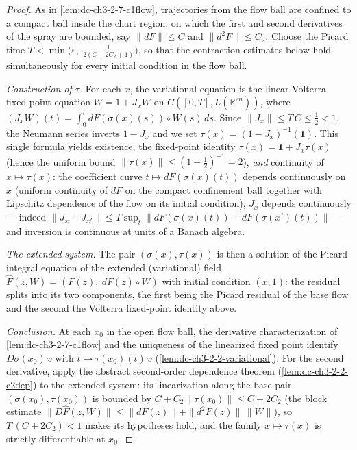 \begin{proof}
  \sketch

  As in \cref{lem:dc-ch3-2-7-c1flow}, trajectories from the flow ball are
  confined to a compact ball inside the chart region, on which the first and
  second derivatives of the spray are bounded, say $\|dF\| \le C$ and
  $\|d^2F\| \le C_2$. Choose the Picard time
  $T < \min\big(\varepsilon,\ \tfrac{1}{2(C + 2C_2 + 1)}\big)$, so that the
  contraction estimates below hold simultaneously for every initial condition
  in the flow ball.

  \emph{Construction of $\tau$.} For each $x$, the variational equation is
  the linear Volterra fixed-point equation $W = 1 + J_x W$ on $C([0,T],
  L(\mathbb{R}^{2n}))$, where $(J_x W)(t) = \int_0^t dF(\sigma(x)(s)) \circ
  W(s)\, ds$. Since $\|J_x\| \le T\,C \le \tfrac12 < 1$, the Neumann series
  inverts $1 - J_x$ and we set $\tau(x) = (1 - J_x)^{-1}(\mathbf{1})$. This
  single formula yields existence, the fixed-point identity
  $\tau(x) = \mathbf{1} + J_x \tau(x)$ (hence the uniform bound
  $\|\tau(x)\| \le (1 - \tfrac12)^{-1} = 2$), \emph{and} continuity of
  $x \mapsto \tau(x)$: the coefficient curve $t \mapsto dF(\sigma(x)(t))$
  depends continuously on $x$ (uniform continuity of $dF$ on the compact
  confinement ball together with Lipschitz dependence of the flow on its
  initial condition), $J_x$ depends continuously — indeed
  $\|J_x - J_{x'}\| \le T \sup_t \|dF(\sigma(x)(t)) - dF(\sigma(x')(t))\|$ —
  and inversion is continuous at units of a Banach algebra.

  \emph{The extended system.} The pair $(\sigma(x), \tau(x))$ is then a
  solution of the Picard integral equation of the extended (variational)
  field $\hat F(z, W) = (F(z),\ dF(z) \circ W)$ with initial condition
  $(x, 1)$: the residual splits into its two components, the first being the
  Picard residual of the base flow and the second the Volterra fixed-point
  identity above.

  \emph{Conclusion.} At each $x_0$ in the open flow ball, the derivative
  characterization of \cref{lem:dc-ch3-2-7-c1flow} and the uniqueness of the
  linearized fixed point identify $D\sigma(x_0)\,v$ with
  $t \mapsto \tau(x_0)(t)\,v$ (\cref{lem:dc-ch3-2-2-variational}). For the
  second derivative, apply the abstract second-order dependence theorem
  (\cref{lem:dc-ch3-2-2-c2dep}) to the extended system: its linearization
  along the base pair $(\sigma(x_0), \tau(x_0))$ is bounded by
  $C + C_2 \|\tau(x_0)\| \le C + 2C_2$ (the block estimate
  $\|D\hat F(z, W)\| \le \|dF(z)\| + \|d^2F(z)\|\,\|W\|$), so
  $T\,(C + 2C_2) < 1$ makes its hypotheses hold, and the family
  $x \mapsto \tau(x)$ is strictly differentiable at $x_0$.
\end{proof}

